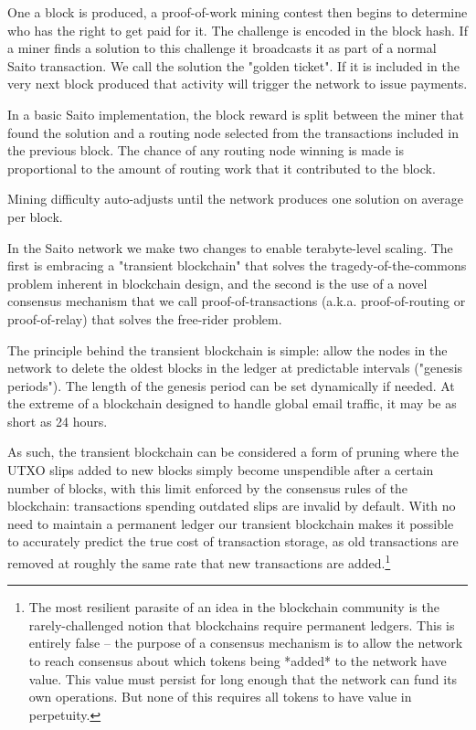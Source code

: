 \documentclass[11.5pt, oneside]{article}   	%
\begin{document}
\begin{multicols}{2}
One a block is produced, a proof-of-work mining contest then begins to determine who has the right to get paid for it. The challenge is encoded in the block hash. If a miner finds a solution to this challenge it broadcasts it as part of a normal Saito transaction. We call the solution the "golden ticket". If it is included in the very next block produced that activity will trigger the network to issue payments. 

In a basic Saito implementation, the block reward is split between the miner that found the solution and a routing node selected from the transactions included in the previous block. The chance of any routing node winning is made is proportional to the amount of routing work that it contributed to the block. 

Mining difficulty auto-adjusts until the network produces one solution on average per block.






In the Saito network we make two changes to enable terabyte-level scaling. The first is embracing a "transient blockchain" that solves the tragedy-of-the-commons problem inherent in blockchain design, and the second is the use of a novel consensus mechanism that we call proof-of-transactions (a.k.a. proof-of-routing or proof-of-relay) that solves the free-rider problem. 

The principle behind the transient blockchain is simple: allow the nodes in the network to delete the oldest blocks in the ledger at predictable intervals ("genesis periods"). The length of the genesis period can be set dynamically if needed. At the extreme of a blockchain designed to handle global email traffic, it may be as short as 24 hours.

As such, the transient blockchain can be considered a form of pruning where the UTXO slips added to new blocks simply become unspendible after a certain number of blocks, with this limit enforced by the consensus rules of the blockchain: transactions spending outdated slips are invalid by default. With no need to maintain a permanent ledger our transient blockchain makes it possible to accurately predict the true cost of transaction storage, as old transactions are removed at roughly the same rate that new transactions are added.\footnote[1]{The most resilient parasite of an idea in the blockchain community is the rarely-challenged notion that blockchains require permanent ledgers. This is entirely false -- the purpose of a consensus mechanism is to allow the network to reach consensus about which tokens being *added* to the network have value. This value must persist for long enough that the network can fund its own operations. But none of this requires all tokens to have value in perpetuity.}


\end{multicols}
\end{document}
